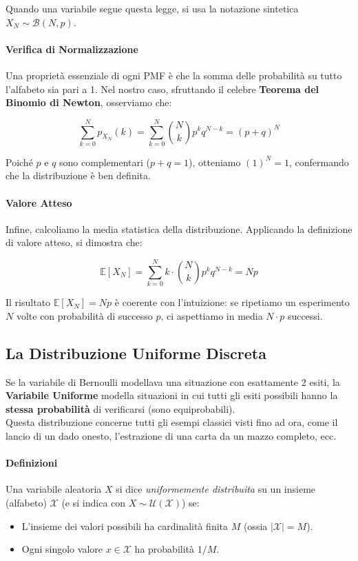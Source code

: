 Quando una variabile segue questa legge, si usa la notazione sintetica $X_N \sim \mathcal{B}(N, p)$.

\paragraph{Verifica di Normalizzazione}
Una proprietà essenziale di ogni PMF è che la somma delle probabilità su tutto l'alfabeto sia pari a 1. Nel nostro caso, sfruttando il celebre \textbf{Teorema del Binomio di Newton}, osserviamo che:

\[
\sum_{k=0}^{N} p_{X_N}(k) = \sum_{k=0}^{N} \binom{N}{k} p^k q^{N-k} = (p + q)^N
\]

Poiché $p$ e $q$ sono complementari ($p+q=1$), otteniamo $(1)^N = 1$, confermando che la distribuzione è ben definita.

\paragraph{Valore Atteso}
Infine, calcoliamo la media statistica della distribuzione. Applicando la definizione di valore atteso, si dimostra che:

\begin{equation}
\mathbb{E}[X_N] = \sum_{k=0}^{N} k \cdot \binom{N}{k} p^k q^{N-k} = Np
\end{equation}

Il risultato $\mathbb{E}[X_N] = Np$ è coerente con l'intuizione: se ripetiamo un esperimento $N$ volte con probabilità di successo $p$, ci aspettiamo in media $N \cdot p$ successi.

\subsection{La Distribuzione Uniforme Discreta}

Se la variabile di Bernoulli modellava una situazione con esattamente 2 esiti, la \textbf{Variabile Uniforme} modella situazioni in cui tutti gli esiti possibili hanno la \textbf{stessa probabilità} di verificarsi (sono equiprobabili).
\\Questa distribuzione concerne tutti gli esempi classici visti fino ad ora, come il lancio di un dado onesto, l'estrazione di una carta da un mazzo completo, ecc.

\paragraph{Definizioni}
Una variabile aleatoria $X$ si dice \textit{uniformemente distribuita} su un insieme (alfabeto) $\mathcal{X}$ (e si indica con $X \sim \mathcal{U}(\mathcal{X})$) se:
\begin{itemize}
    \item L'insieme dei valori possibili ha cardinalità finita $M$ (ossia $|\mathcal{X}| = M$).
    \item Ogni singolo valore $x \in \mathcal{X}$ ha probabilità $1/M$.
\end{itemize}


